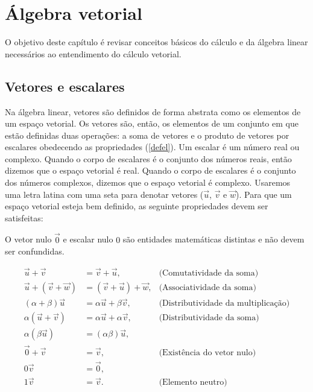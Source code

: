 
\chapter{Álgebra vetorial}
O objetivo deste capítulo é revisar conceitos básicos do cálculo e da álgebra linear necessários ao entendimento do cálculo vetorial.    


\section{Vetores e escalares}
Na álgebra linear, vetores são definidos de forma abstrata como os elementos de um espaço vetorial. Os vetores são, então, os elementos de um conjunto em que estão definidas duas operações: a soma de vetores e o produto de vetores por escalares obedecendo as propriedades (\ref{defel}). Um escalar é um número real ou complexo. Quando o corpo de escalares é o conjunto dos números reais, então dizemos que o espaço vetorial é real. Quando o corpo de escalares é o conjunto dos números complexos, dizemos que o espaço vetorial é complexo. Usaremos uma letra latina com uma seta para denotar vetores ($\vec{u}$, $\vec{v}$ e $\vec{w}$).  Para que um espaço vetorial esteja bem definido, as seguinte propriedades devem ser satisfeitas:

\begin{obs} O vetor nulo $\vec{0}$ e escalar nulo $0$ são entidades matemáticas distintas e não devem ser confundidas.\end{obs}
\begin{subequations}\label{defel}
\begin{align}
\vec{u}+\vec{v}&=\vec{v}+\vec{u},&\text{(Comutatividade da soma)}\label{defelcom}\\
\vec{u}+\left(\vec{v}+\vec{w}\right)&=\left(\vec{v}+\vec{u}\right)+\vec{w},&\text{(Associatividade da soma)}\label{defelass}\\
\left(\alpha+\beta\right) \vec{u}&=\alpha\vec{u}+\beta\vec{v},&\text{(Distributividade da multiplicação)}\label{defeldist1}\\
\alpha \left(\vec{u}+\vec{v}\right)&= \alpha \vec{u}+\alpha\vec{v},&\text{(Distributividade da soma)}\label{defeldist2}\\
\alpha \left(\beta\vec{u}\right)&=\left(\alpha\beta\right)\vec{u},\label{defeldist3}\\
\vec{0}+\vec{v}&=\vec{v}, &\text{(Existência do vetor nulo)}\label{defelnulo}\\
0\vec{v}&=\vec{0},\label{defelnulo2}\\
1\vec{v}&=\vec{v}.&\text{(Elemento neutro)}\label{defelneutro}
\end{align}
\end{subequations}

